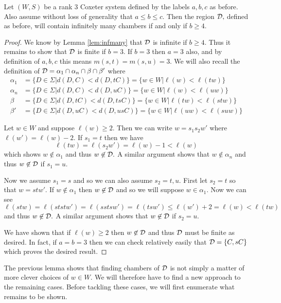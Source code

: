 \documentclass[class=book, crop=false]{standalone}
\begin{document}
\begin{lemma} 
	\label{lem:infD}
	Let $(W,S)$ be a rank 3 Coxeter system defined by the labels $a,b,c$ as before. Also assume without loss of generality that $a\le b\le c.$ Then the region $\mathcal{D},$ defined as before, will contain infinitely many chambers if and only if $b\ge 4.$
\end{lemma}
\begin{proof}
	We know by Lemma \ref{lem:infmany} that $\mathcal{D}$ is infinite if $b\ge 4.$ Thus it remains to show that $\mathcal{D}$ is finite if $b=3.$ If $b=3$ then $a=3$ also, and by definition of $a,b,c$ this means $m(s,t)=m(s,u)=3.$ We will also recall the definition of $\mathcal{D}=\alpha_1\cap \alpha_n\cap \beta \cap \beta'$ where
	\begin{align*}
	\alpha_1&=\{D\in \Sigma|d(D,C)<d(D,tC)\}=\{w\in W|\ell(w)<\ell(tw)\}\\
	\alpha_n&=\{D\in \Sigma|d(D,C)<d(D,uC)\}=\{w\in W|\ell(w)<\ell(uw)\}\\
	\beta&=\{D\in \Sigma|d(D,tC)<d(D,tsC)\}=\{w\in W|\ell(tw)<\ell(stw)\}\\
	\beta'&=\{D\in \Sigma|d(D,uC)<d(D,usC)\}=\{w\in W|\ell(uw)<\ell(suw)\}
\end{align*}

Let $w\in W$ and suppose $\ell(w)\ge 2.$ Then we can write $w=s_1s_2w'$ where $\ell(w')=\ell(w)-2.$ If $s_1=t$ then we have
\[
	\ell(tw)=\ell(s_2w')=\ell(w)-1<\ell(w)
\]
which shows $w\not\in \alpha_1$ and thus $w\not\in \mathcal{D}.$ A similar argument shows that $w\not\in \alpha_n$ and thus $w\not\in \mathcal{D}$ if $s_1=u.$

Now we assume $s_1=s$ and so we can also assume $s_2=t,u.$ First let $s_2=t$ so that $w=stw'.$ If $w\not\in \alpha_1$ then $w\not\in \mathcal{D}$ and so we will suppose $w\in\alpha_1.$ Now we can see
\[
	\ell(stw)=\ell(ststw')=\ell(sstsw')=\ell(tsw')\le \ell(w')+2=\ell(w)<\ell(tw)
\]
and thus $w\not\in \mathcal{D}.$ A similar argument shows that $w\not\in \mathcal{D}$ if $s_2=u.$

We have shown that if $\ell(w)\ge 2$ then $w\not\in \mathcal{D}$ and thus $\mathcal{D}$ must be finite as desired. In fact, if $a=b=3$ then we can check relatively easily that $\mathcal{D}=\{C,sC\}$ which proves the desired result.
\end{proof}

The previous lemma shows that finding chambers of $\mathcal{D}$ is not simply a matter of more clever choices of $w\in W.$ We will therefore have to find a new approach to the remaining cases. Before tackling these cases, we will first enumerate what remains to be shown.
\end{document}
